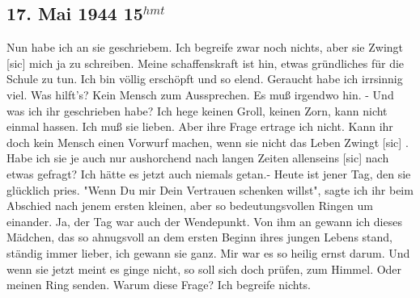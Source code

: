 \subsection{17. Mai 1944 15$^{hmt}$}

Nun habe ich an sie geschriebem.
Ich begreife zwar noch nichts, aber sie Zwingt{\color{red} [sic] } mich ja zu schreiben.
Meine schaffenskraft ist hin, etwas gr\"{u}ndliches f\"{u}r die Schule zu tun.
Ich bin v\"{o}llig ersch\"{o}pft und so elend.
Geraucht habe ich irrsinnig viel.
Was hilft's?
Kein Mensch zum Aussprechen.
Es mu{\ss} irgendwo hin.
- Und was ich ihr geschrieben habe?
Ich hege keinen Groll, keinen Zorn, kann nicht einmal hassen.
Ich mu{\ss} sie lieben.
Aber ihre Frage ertrage ich nicht.
Kann ihr doch kein Mensch einen Vorwurf machen, wenn sie nicht das Leben Zwingt{\color{red} [sic] }.
Habe ich sie je auch nur aushorchend nach langen Zeiten allenseins{\color{red} [sic] } nach etwas gefragt?
Ich h\"{a}tte es jetzt auch niemals getan.-
Heute ist jener Tag, den sie gl\"{u}cklich pries.
"Wenn Du mir Dein Vertrauen schenken willst", sagte ich ihr beim Abschied nach jenem ersten kleinen, aber so bedeutungsvollen Ringen um einander.
Ja, der Tag war auch der Wendepunkt.
Von ihm an gewann ich dieses M\"{a}dchen, das so ahnugsvoll an dem ersten Beginn ihres jungen Lebens stand, st\"{a}ndig immer lieber, ich gewann sie ganz.
Mir war es so heilig ernst darum.
Und wenn sie jetzt meint es ginge nicht, so soll sich doch pr\"{u}fen, zum Himmel.
Oder meinen Ring senden.
Warum diese Frage?
Ich begreife nichts.

\clearpage
